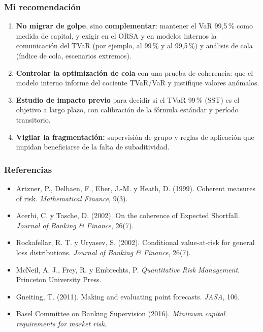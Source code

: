 \documentclass[a4paper,12pt]{article}
\begin{document}
\subsubsection*{Mi recomendaci\'on}
\begin{enumerate}[leftmargin=*,itemsep=2pt]
\item \textbf{No migrar de golpe}, sino \textbf{complementar}: mantener el VaR 99,5\,\% como medida de capital, y exigir en el ORSA y en modelos internos la comunicaci\'on del TVaR (por ejemplo, al 99\,\% y al 99,5\,\%) y an\'alisis de cola (\'indice de cola, escenarios extremos).
\item \textbf{Controlar la optimizaci\'on de cola} con una prueba de coherencia: que el modelo interno informe del cociente TVaR/VaR y justifique valores an\'omalos.
\item \textbf{Estudio de impacto previo} para decidir si el TVaR 99\,\% (SST) es el objetivo a largo plazo, con calibraci\'on de la f\'ormula est\'andar y per\'iodo transitorio.
\item \textbf{Vigilar la fragmentaci\'on:} supervisi\'on de grupo y reglas de aplicaci\'on que impidan beneficiarse de la falta de subaditividad.
\end{enumerate}

\subsubsection*{Referencias}
\begin{itemize}[leftmargin=*,itemsep=0pt]
\item Artzner, P., Delbaen, F., Eber, J.-M. y Heath, D. (1999). Coherent measures of risk. \emph{Mathematical Finance}, 9(3).
\item Acerbi, C. y Tasche, D. (2002). On the coherence of Expected Shortfall. \emph{Journal of Banking \& Finance}, 26(7).
\item Rockafellar, R. T. y Uryasev, S. (2002). Conditional value-at-risk for general loss distributions. \emph{Journal of Banking \& Finance}, 26(7).
\item McNeil, A. J., Frey, R. y Embrechts, P. \emph{Quantitative Risk Management}. Princeton University Press.
\item Gneiting, T. (2011). Making and evaluating point forecasts. \emph{JASA}, 106.
\item Basel Committee on Banking Supervision (2016). \emph{Minimum capital requirements for market risk}.
\end{itemize}
\end{document}
